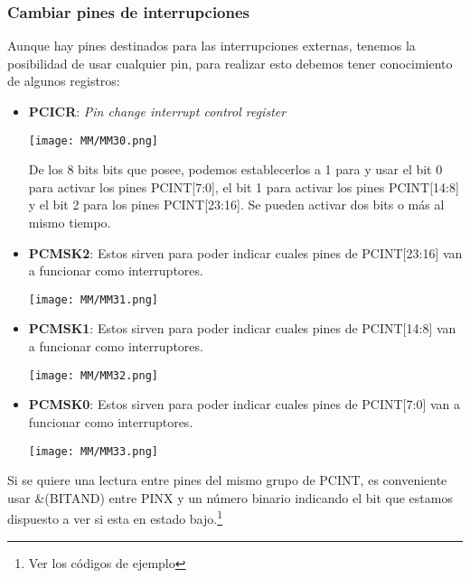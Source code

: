 \documentclass[
	12pt, %
	fleqn, %
	a4paper, %
	oneside, %
]{LegrandOrangeBook}
\begin{document}
\subsubsection{Cambiar pines de interrupciones}
Aunque hay pines destinados para las interrupciones externas, tenemos la posibilidad de usar cualquier pin, para realizar esto debemos tener conocimiento de algunos registros:
\begin{itemize}
\item \textbf{PCICR}: \textit{Pin change interrupt control register}
\begin{center}
\texttt{[image: MM/MM30.png]}
\end{center}
De los 8 bits bits que posee, podemos establecerlos a 1 para y usar el bit 0 para activar los pines PCINT[7:0], el bit 1 para activar los pines PCINT[14:8] y  el bit 2 para los pines PCINT[23:16]. Se pueden activar dos bits o más al mismo tiempo.
\item \textbf{PCMSK2}: Estos sirven para poder indicar cuales pines de PCINT[23:16] van a funcionar como interruptores.
\begin{center}
\texttt{[image: MM/MM31.png]}
\end{center}
\item \textbf{PCMSK1}: Estos sirven para poder indicar cuales pines de PCINT[14:8] van a funcionar como interruptores.
\begin{center}
\texttt{[image: MM/MM32.png]}
\end{center}
\item \textbf{PCMSK0}: Estos sirven para poder indicar cuales pines de PCINT[7:0] van a funcionar como interruptores.
\begin{center}
\texttt{[image: MM/MM33.png]}
\end{center}
\end{itemize}
Si se quiere una lectura entre pines del mismo grupo de PCINT, es conveniente usar \&(BITAND) entre PINX y un número binario indicando el bit que estamos dispuesto a ver si esta en estado bajo.\footnote{Ver los códigos de ejemplo}
\end{document}
